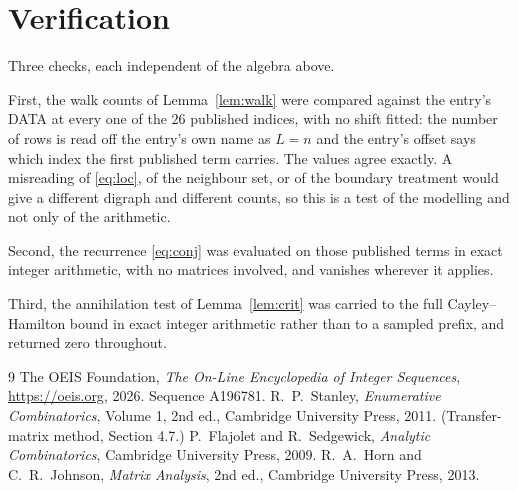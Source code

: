 \documentclass[11pt,a4paper]{article}
\theoremstyle{plain}
\theoremstyle{definition}
\begin{document}
\section{Verification}

Three checks, each independent of the algebra above.

First, the walk counts of Lemma~\ref{lem:walk} were compared against the entry's DATA at
every one of the $26$ published indices, with no shift fitted: the number of rows is
read off the entry's own name as $L=n$ and the entry's offset says which index the first
published term carries. The values agree exactly. A misreading of \eqref{eq:loc}, of the
neighbour set, or of the boundary treatment would give a different digraph and different
counts, so this is a test of the modelling and not only of the arithmetic.

Second, the recurrence \eqref{eq:conj} was evaluated on those published terms in exact
integer arithmetic, with no matrices involved, and vanishes wherever it applies.

Third, the annihilation test of Lemma~\ref{lem:crit} was carried to the full
Cayley--Hamilton bound in exact integer arithmetic rather than to a sampled prefix, and
returned zero throughout.

\begin{thebibliography}{9}
 The OEIS Foundation, \emph{The On-Line Encyclopedia of Integer
Sequences}, \url{https://oeis.org}, 2026. Sequence A196781.
 R.~P.~Stanley, \emph{Enumerative Combinatorics}, Volume 1, 2nd ed.,
Cambridge University Press, 2011. (Transfer-matrix method, Section 4.7.)
 P.~Flajolet and R.~Sedgewick, \emph{Analytic Combinatorics}, Cambridge
University Press, 2009.
 R.~A.~Horn and C.~R.~Johnson, \emph{Matrix Analysis}, 2nd ed., Cambridge
University Press, 2013.
\end{thebibliography}
\end{document}

